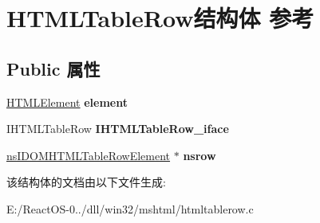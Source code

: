 \hypertarget{struct_h_t_m_l_table_row}{}\section{H\+T\+M\+L\+Table\+Row结构体 参考}
\label{struct_h_t_m_l_table_row}
\subsection*{Public 属性}
\begin{DoxyCompactItemize}
\item 
\mbox{\label{struct_h_t_m_l_table_row_a9b0019e0a6f634f0e246bbf1313320ed}} 
\hyperlink{struct_h_t_m_l_element}{H\+T\+M\+L\+Element} {\bfseries element}
\item 
\mbox{\label{struct_h_t_m_l_table_row_a65008d9f125023dea2002d0888955f3a}} 
I\+H\+T\+M\+L\+Table\+Row {\bfseries I\+H\+T\+M\+L\+Table\+Row\+\_\+iface}
\item 
\mbox{\label{struct_h_t_m_l_table_row_ac4ee449dfb8be6f174c56cee552802b8}} 
\hyperlink{interfacens_i_d_o_m_h_t_m_l_table_row_element}{ns\+I\+D\+O\+M\+H\+T\+M\+L\+Table\+Row\+Element} $\ast$ {\bfseries nsrow}
\end{DoxyCompactItemize}


该结构体的文档由以下文件生成\+:\begin{DoxyCompactItemize}
\item 
E\+:/\+React\+O\+S-\/0../dll/win32/mshtml/htmltablerow.\+c\end{DoxyCompactItemize}
